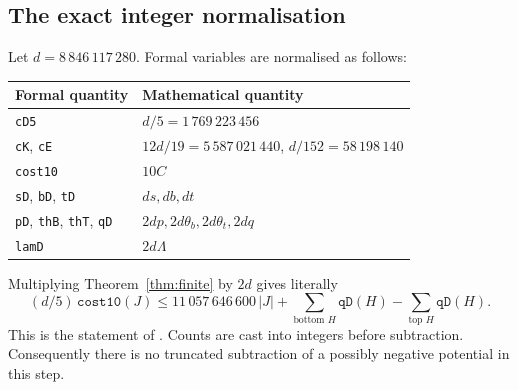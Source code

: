 \subsection{The exact integer normalisation}\label{sec:scaling}
Let \(d=8\,846\,117\,280\). Formal variables are normalised as follows:
\begin{center}
\begin{tabular}{@{}ll@{}}\toprule
Formal quantity & Mathematical quantity\\\midrule
\texttt{cD5} & \(d/5=1\,769\,223\,456\)\\
\texttt{cK}, \texttt{cE} & \(12d/19=5\,587\,021\,440\), \(d/152=58\,198\,140\)\\
\texttt{cost10} & \(10C\)\\
\texttt{sD}, \texttt{bD}, \texttt{tD} & \(ds,db,dt\)\\
\texttt{pD}, \texttt{thB}, \texttt{thT}, \texttt{qD} & \(2dp,2d\theta_b,2d\theta_t,2dq\)\\
\texttt{lamD} & \(2d\Lambda\)\\\bottomrule
\end{tabular}
\end{center}
Multiplying Theorem~\ref{thm:finite} by \(2d\) gives literally
\[
 (d/5)\,\texttt{cost10}(J)\leq
 11\,057\,646\,600\,|J|+
 \sum_{\text{bottom }H}\texttt{qD}(H)-
 \sum_{\text{top }H}\texttt{qD}(H).
\]
This is the statement of . Counts are
cast into integers before subtraction. Consequently there is no
truncated subtraction of a possibly negative potential in this step.
